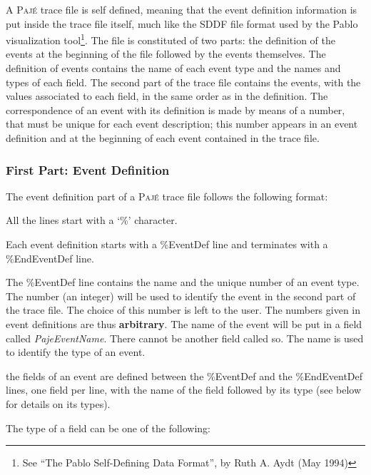 \documentclass[12pt]{article}
\newcommand{\Paje}{\textsc{Paj\'e}\xspace}
\newcommand{\PajeField}[1]{\emph{#1}\xspace}
\newenvironment{itemize*}%
               {\vspace{-1em}
                 \begin{itemize}%
                   \setlength{\itemsep}{0pt}%
                   \setlength{\parskip}{0pt}}%
               {\end{itemize}}
\begin{document}
A \Paje trace file is self defined, meaning that the event definition
information is put inside the trace file itself, much like the SDDF
file format used by the Pablo visualization tool\footnote{See ``The
  Pablo Self-Defining Data Format'', by Ruth A. Aydt (May 1994)}.  The
file is constituted of two parts: the definition of the events at the
beginning of the file followed by the events themselves.  The
definition of events contains the name of each event type and the
names and types of each field.  The second part of the trace file
contains the events, with the values associated to each field, in the
same order as in the definition.  The correspondence of an event with
its definition is made by means of a number, that must be unique for
each event description; this number appears in an event definition and
at the beginning of each event contained in the trace file.

\subsubsection*{First Part: Event Definition}

The event definition part of a \Paje trace file follows the following format:

\begin{itemize*}
\item All the lines start with a `\%' character.
\item Each event definition starts with a \%EventDef line and
  terminates with a \%EndEventDef line.
\item The \%EventDef line contains the name and the unique number of
  an event type.  The number (an integer) will be used to identify the
  event in the second part of the trace file. The choice of this
  number is left to the user. The numbers given in event definitions
  are thus \textbf{arbitrary}. The name of the event will be put in a
  field called \PajeField{PajeEventName}. There cannot be another
  field called so. The name is used to identify the type of an event.
\item the fields of an event are defined between the \%EventDef and
  the \%EndEventDef lines, one field per line, with the name
  of the field followed by its type (see below for details on its types).
\end{itemize*}

The type of a field can be one of the following:
\end{document}
